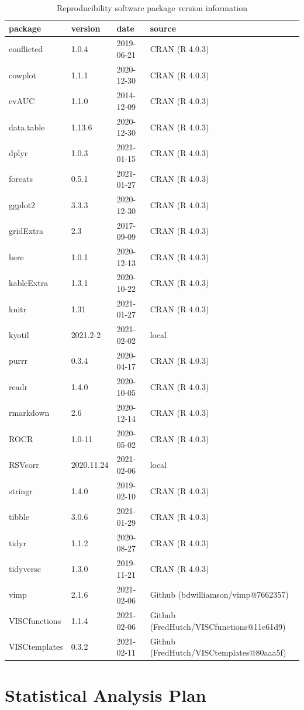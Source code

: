 \documentclass[11pt]{article}
\begin{document}
\begin{table}[!h]

\caption{\label{tab:Software-Package-Version-Information}Reproducibility software package version information}
\centering
\fontsize{8}{10}\selectfont
\begin{tabular}[t]{llll}
\toprule
package & version & date & source\\
\midrule
conflicted & 1.0.4 & 2019-06-21 & CRAN (R 4.0.3)\\
cowplot & 1.1.1 & 2020-12-30 & CRAN (R 4.0.3)\\
cvAUC & 1.1.0 & 2014-12-09 & CRAN (R 4.0.3)\\
data.table & 1.13.6 & 2020-12-30 & CRAN (R 4.0.3)\\
dplyr & 1.0.3 & 2021-01-15 & CRAN (R 4.0.3)\\
forcats & 0.5.1 & 2021-01-27 & CRAN (R 4.0.3)\\
ggplot2 & 3.3.3 & 2020-12-30 & CRAN (R 4.0.3)\\
gridExtra & 2.3 & 2017-09-09 & CRAN (R 4.0.3)\\
here & 1.0.1 & 2020-12-13 & CRAN (R 4.0.3)\\
kableExtra & 1.3.1 & 2020-10-22 & CRAN (R 4.0.3)\\
knitr & 1.31 & 2021-01-27 & CRAN (R 4.0.3)\\
kyotil & 2021.2-2 & 2021-02-02 & local\\
purrr & 0.3.4 & 2020-04-17 & CRAN (R 4.0.3)\\
readr & 1.4.0 & 2020-10-05 & CRAN (R 4.0.3)\\
rmarkdown & 2.6 & 2020-12-14 & CRAN (R 4.0.3)\\
ROCR & 1.0-11 & 2020-05-02 & CRAN (R 4.0.3)\\
RSVcorr & 2020.11.24 & 2021-02-06 & local\\
stringr & 1.4.0 & 2019-02-10 & CRAN (R 4.0.3)\\
tibble & 3.0.6 & 2021-01-29 & CRAN (R 4.0.3)\\
tidyr & 1.1.2 & 2020-08-27 & CRAN (R 4.0.3)\\
tidyverse & 1.3.0 & 2019-11-21 & CRAN (R 4.0.3)\\
vimp & 2.1.6 & 2021-02-06 & Github (bdwilliamson/vimp@7662357)\\
VISCfunctions & 1.1.4 & 2021-02-06 & Github (FredHutch/VISCfunctions@11e61d9)\\
VISCtemplates & 0.3.2 & 2021-02-11 & Github (FredHutch/VISCtemplates@80aaa5f)\\
\bottomrule
\end{tabular}
\end{table}

\hypertarget{statistical-analysis-plan}{%
\section{Statistical Analysis Plan}\label{statistical-analysis-plan}}
\label{LastPageOfBackMatter}~
\end{document}

